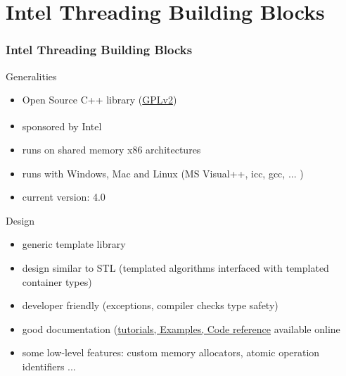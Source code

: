 \documentclass[9pt,pdftex]{beamer}
\begin{document}
\section[TBB]{Intel Threading Building Blocks}
\begin{frame}
  \frametitle{Intel Threading Building Blocks}
  \begin{block}{Generalities}
    \begin{itemize}
    \item Open Source C++ library (\href{http://gcc.gnu.org/onlinedocs/libstdc++/manual/bk01pt01ch01s02.html}{GPLv2})
    \item sponsored by Intel\textsuperscript{\texttrademark}
    \item runs on shared memory x86 architectures
    \item runs with Windows, Mac and Linux (MS Visual++, icc, gcc, ... )
    \item current version: 4.0 
    \end{itemize}
  \end{block}

  \begin{block}{Design}
    \begin{itemize}
    \item generic template library
    \item design similar to STL (templated algorithms interfaced with templated container types)
    \item developer friendly (exceptions, compiler checks type safety)
    \item good documentation (\href{http://threadingbuildingblocks.org/documentation.php}{tutorials, Examples, Code reference} available online
    \item some low-level features: custom memory allocators, atomic operation identifiers ...
    \end{itemize}
  \end{block}
\end{frame}
\end{document}
